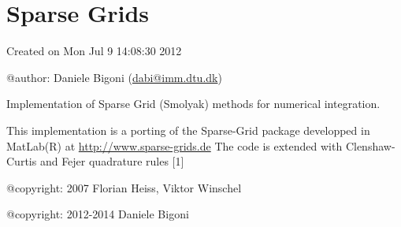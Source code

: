\documentclass[letterpaper,10pt,english]{sphinxmanual}
\begin{document}
\label{index:module-SpectralToolbox.SparseGrids}

\chapter{Sparse Grids}
\label{index:sparse-grids}
Created on Mon Jul  9 14:08:30 2012

@author: Daniele Bigoni (\href{mailto:dabi@imm.dtu.dk}{dabi@imm.dtu.dk})

Implementation of Sparse Grid (Smolyak) methods for numerical integration.

This implementation is a porting of the Sparse-Grid package developped in MatLab(R) at \href{http://www.sparse-grids.de}{http://www.sparse-grids.de}
The code is extended with Clenshaw-Curtis and Fejer quadrature rules {[}1{]}

@copyright: 2007 Florian Heiss, Viktor Winschel

@copyright: 2012-2014 Daniele Bigoni
\end{document}
